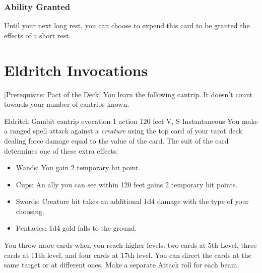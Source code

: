 \documentclass[10pt,twoside,twocolumn,openany,nodeprecatedcode]{dndbook}
\begin{document}
    \subsubsection*{Ability Granted}
    Until your next long rest, you can choose to expend this card to be granted the effects of a short rest.


    \section*{Eldritch Invocations}
    [Prerequisite: Pact of the Deck]
    You learn the following cantrip. It doesn't count towards your number of cantrips known.

    \DndSpellHeader%
        {Eldritch Gambit}
        {cantrip evocation}
        {1 action}
        {120 feet}
        {V, S}
        {Instantaneous}
    You make a ranged spell attack against a \emph{creature} using the top card of your tarot deck dealing force damage equal to the value of the card.
    The suit of the card determines one of these extra effects:
    \begin{itemize}
        \item Wands: You gain 2 temporary hit point.
        \item Cups: An ally you can see within 120 feet gains 2 temporary hit points.
        \item Swords: Creature hit takes an additional 1d4 damage with the type of your choosing.
        \item Pentacles: 1d4 gold falls to the ground.
    \end{itemize}

    You throw more cards when you reach higher levels: two cards at 5th Level, 
    three cards at 11th level, and four cards at 17th level. 
    You can direct the cards at the same target or at different ones. 
    Make a separate Attack roll for each beam.
\end{document}
